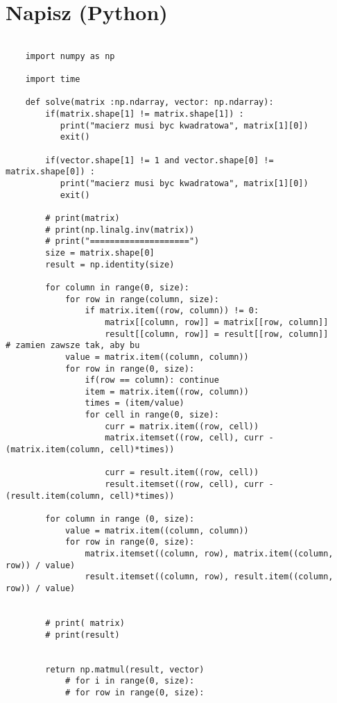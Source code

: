
\section{Napisz (Python)}
\begin{verbatim}

    import numpy as np 

    import time
    
    def solve(matrix :np.ndarray, vector: np.ndarray):
        if(matrix.shape[1] != matrix.shape[1]) :
           print("macierz musi byc kwadratowa", matrix[1][0])
           exit()
    
        if(vector.shape[1] != 1 and vector.shape[0] != matrix.shape[0]) :
           print("macierz musi byc kwadratowa", matrix[1][0])
           exit()
    
        # print(matrix)
        # print(np.linalg.inv(matrix))
        # print("====================")
        size = matrix.shape[0]
        result = np.identity(size)
    
        for column in range(0, size):
            for row in range(column, size):
                if matrix.item((row, column)) != 0:
                    matrix[[column, row]] = matrix[[row, column]]
                    result[[column, row]] = result[[row, column]]                 # zamien zawsze tak, aby bu
            value = matrix.item((column, column))
            for row in range(0, size):
                if(row == column): continue
                item = matrix.item((row, column))
                times = (item/value)
                for cell in range(0, size):
                    curr = matrix.item((row, cell))
                    matrix.itemset((row, cell), curr - (matrix.item(column, cell)*times))
                    
                    curr = result.item((row, cell))
                    result.itemset((row, cell), curr - (result.item(column, cell)*times))
    
        for column in range (0, size):
            value = matrix.item((column, column))
            for row in range(0, size):
                matrix.itemset((column, row), matrix.item((column, row)) / value)
                result.itemset((column, row), result.item((column, row)) / value)
    
        
        # print( matrix)
        # print(result)
    
        
        return np.matmul(result, vector)
            # for i in range(0, size):
            # for row in range(0, size):
    

\end{verbatim}
